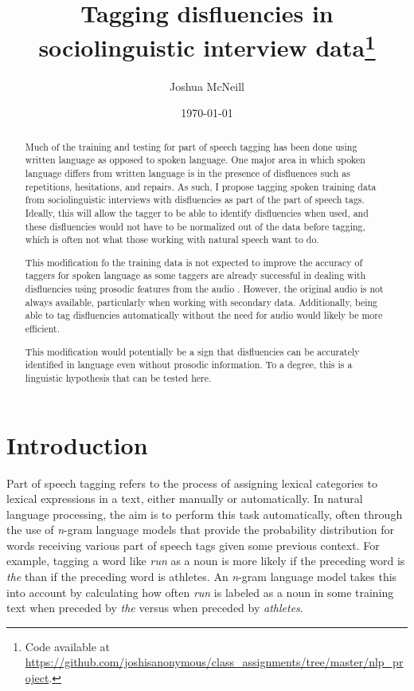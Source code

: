 \documentclass{article}
\title{Tagging disfluencies in sociolinguistic interview data\footnote{Code available at \url{https://github.com/joshisanonymous/class_assignments/tree/master/nlp_project}.}}
\author{Joshua McNeill}
\date{\today}
\newcommand{\lexi}[1]{\textit{#1}}
\begin{document}
  \maketitle
  \begin{abstract}
    Much of the training and testing for part of speech tagging has been done using written language as opposed to spoken language.
    One major area in which spoken language differs from written language is in the presence of disfluences such as repetitions, hesitations, and repairs.
    As such, I propose tagging spoken training data from sociolinguistic interviews with disfluencies as part of the part of speech tags.
    Ideally, this will allow the tagger to be able to identify disfluencies when used, and these disfluencies would not have to be normalized out of the data before tagging, which is often not what those working with natural speech want to do.

    This modification fo the training data is not expected to improve the accuracy of taggers for spoken language as some taggers are already successful in dealing with disfluencies using prosodic features from the audio \parencite[e.g.,][]{christodoulides_dismo:_2018}.
    However, the original audio is not always available, particularly when working with secondary data.
    Additionally, being able to tag disfluencies automatically without the need for audio would likely be more efficient.

    This modification would potentially be a sign that disfluencies can be accurately identified in language even without prosodic information.
    To a degree, this is a linguistic hypothesis that can be tested here.
  \end{abstract}

  \section{Introduction}
    Part of speech tagging refers to the process of assigning lexical categories to lexical expressions in a text, either manually or automatically.
    In natural language processing, the aim is to perform this task automatically, often through the use of \emph{n}-gram language models that provide the probability distribution for words receiving various part of speech tags given some previous context.
    For example, tagging a word like \lexi{run} as a noun is more likely if the preceding word is \lexi{the} than if the preceding word is {athletes}.
    An \emph{n}-gram language model takes this into account by calculating how often \lexi{run} is labeled as a noun in some training text when preceded by \lexi{the} versus when preceded by \lexi{athletes}.
\end{document}
